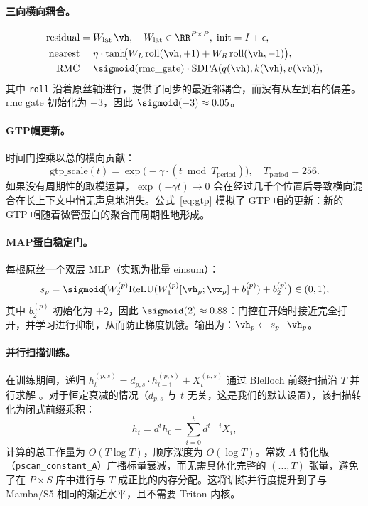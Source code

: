 \paragraph{三向横向耦合。}
\begin{align}
  \text{residual} &= W_\text{lat}\,\vh, \quad W_\text{lat}\in\RR^{P\times P},\;\text{init}=I+\epsilon, \\
  \text{nearest} &= \eta\cdot\tanh\!\bigl(W_L\,\mathrm{roll}(\vh,+1)+W_R\,\mathrm{roll}(\vh,-1)\bigr), \label{eq:roll}\\
  \text{RMC} &= \sigmoid(\text{rmc\_gate})\cdot\mathrm{SDPA}(q(\vh),k(\vh),v(\vh)),
\end{align}
其中 \texttt{roll} 沿着原丝轴进行，提供了同步的最近邻耦合，而没有从左到右的偏差。$\text{rmc\_gate}$ 初始化为 $-3$，因此 $\sigmoid(-3)\approx 0.05$。

\paragraph{GTP帽更新。}
时间门控乘以总的横向贡献：
\begin{equation}
  \text{gtp\_scale}(t) = \exp\!\bigl(-\gamma\cdot(t\bmod T_\text{period})\bigr), \quad T_\text{period}=256.
  \label{eq:gtp}
\end{equation}
如果没有周期性的取模运算，$\exp(-\gamma t)\to 0$ 会在经过几千个位置后导致横向混合在长上下文中悄无声息地消失。公式~\eqref{eq:gtp} 模拟了 GTP 帽的更新：新的 GTP 帽随着微管蛋白的聚合而周期性地形成。

\paragraph{MAP蛋白稳定门。}
每根原丝一个双层 MLP（实现为批量 einsum）：
\begin{equation}
  s_p = \sigmoid\!\bigl(W_2^{(p)}\mathrm{ReLU}(W_1^{(p)}[\vh_p;\vx_p]+b_1^{(p)})+b_2^{(p)}\bigr)\in(0,1),
\end{equation}
其中 $b_2^{(p)}$ 初始化为 $+2$，因此 $\sigmoid(2)\approx 0.88$：门控在开始时接近完全打开，并学习进行抑制，从而防止梯度饥饿。输出为：$\vh_p\leftarrow s_p\cdot\vh_p$。

\paragraph{并行扫描训练。}
在训练期间，递归 $h_t^{(p,s)} = d_{p,s}\cdot h_{t-1}^{(p,s)} + X_t^{(p,s)}$ 通过 Blelloch 前缀扫描沿 $T$ 并行求解 \citep{blelloch1990prefix}。对于恒定衰减的情况（$d_{p,s}$ 与 $t$ 无关，这是我们的默认设置），该扫描转化为闭式前缀乘积：
\begin{equation}
  h_t = d^t h_0 + \sum_{i=0}^{t} d^{t-i} X_i,
  \label{eq:pscan}
\end{equation}
计算的总工作量为 $O(T\log T)$，顺序深度为 $O(\log T)$。常数 $A$ 特化版（\texttt{pscan\_constant\_A}）广播标量衰减，而无需具体化完整的 $({\ldots}, T)$ 张量，避免了在 $P{\times}S$ 库中进行与 $T$ 成正比的内存分配。这将训练并行度提升到了与 Mamba/S5 相同的渐近水平，且不需要 Triton 内核。

